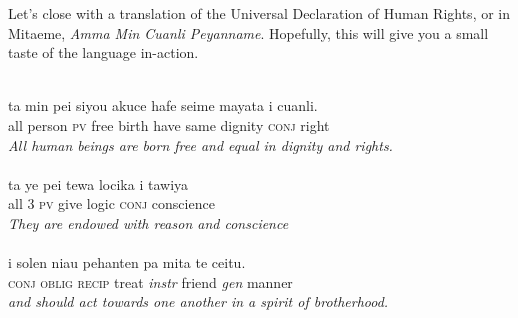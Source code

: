 \documentclass[a4paper, titlepage]{article}
\begin{document}
Let's close with a translation of the Universal Declaration of Human Rights, or in Mitaeme, \textit{Amma Min Cuanli Peyanname}.
Hopefully, this will give you a small taste of the language in-action.\\
\\
\hspace*{1cm}%
\begin{minipage}{.8\textwidth}%
ta min pei siyou akuce hafe seime mayata i cuanli.\\
all person \textsc{pv} free birth have same dignity \textsc{conj} right\\
\textit{All human beings are born free and equal in dignity and rights.}\\
\\
ta ye pei tewa locika i tawiya\\
all \textsc{3 pv} give logic \textsc{conj} conscience\\
\textit{They are endowed with reason and conscience}\\
\\
i solen niau pehanten pa mita te ceitu.\\
\textsc{conj oblig recip} treat \textit{instr} friend \textit{gen} manner\\
\textit{and should act towards one another in a spirit of brotherhood.}
\end{minipage}%
\end{document}
